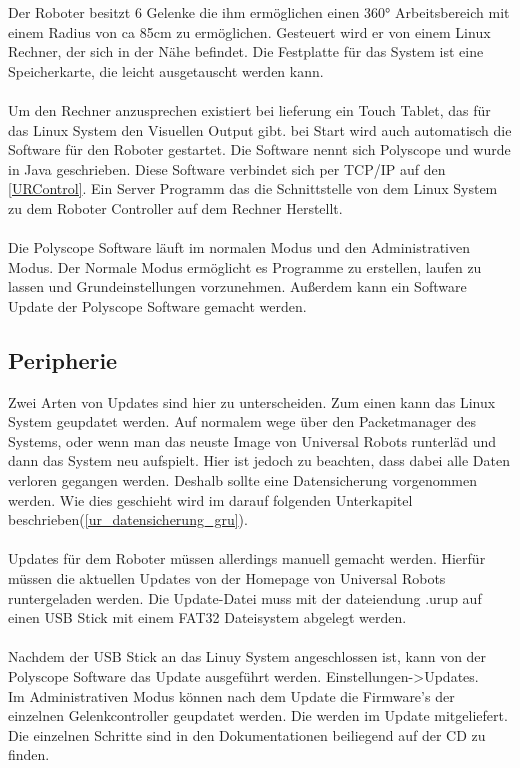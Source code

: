 Der Roboter besitzt 6 Gelenke die ihm ermöglichen einen 360° Arbeitsbereich mit einem Radius von ca 85cm zu ermöglichen. Gesteuert wird er von einem Linux Rechner, der sich in der Nähe befindet. 
Die Festplatte für das System ist eine Speicherkarte, die leicht ausgetauscht werden kann.
\\\\
Um den Rechner anzusprechen existiert bei lieferung ein Touch Tablet, das für das Linux System den Visuellen Output gibt. bei Start wird auch automatisch die Software für den Roboter gestartet. Die Software nennt sich Polyscope und wurde in Java geschrieben. Diese Software verbindet sich per TCP/IP auf den \ref{URControl}. Ein Server Programm das die Schnittstelle von dem Linux System zu dem Roboter Controller auf dem Rechner Herstellt.
\\\\
Die Polyscope Software läuft im normalen Modus und den Administrativen Modus. Der Normale Modus ermöglicht es Programme zu erstellen, laufen zu lassen und Grundeinstellungen vorzunehmen. Außerdem kann ein Software Update der Polyscope Software gemacht werden.

\subsection{Peripherie}
\label{ur_update_gru}

Zwei Arten von Updates sind hier zu unterscheiden. Zum einen kann das Linux System geupdatet werden. Auf normalem wege über den Packetmanager des Systems, oder wenn man das neuste Image von Universal Robots runterläd und dann das System neu aufspielt. Hier ist jedoch zu beachten, dass dabei alle Daten verloren gegangen werden. Deshalb sollte eine Datensicherung vorgenommen werden. Wie dies geschieht wird im darauf folgenden Unterkapitel beschrieben(\ref{ur_datensicherung_gru}).
\\\\
Updates für dem Roboter müssen allerdings manuell gemacht werden. Hierfür müssen die aktuellen Updates von der Homepage von Universal Robots runtergeladen werden. Die Update-Datei muss mit der dateiendung .urup auf einen USB Stick mit einem FAT32 Dateisystem abgelegt werden.\\\\
Nachdem der USB Stick an das Linuy System angeschlossen ist, kann von der Polyscope Software das Update ausgeführt werden. Einstellungen->Updates.\\
Im Administrativen Modus können nach dem Update die Firmware's der einzelnen Gelenkcontroller geupdatet werden. Die werden im Update mitgeliefert. Die einzelnen Schritte sind in den Dokumentationen beiliegend auf der CD zu finden.

